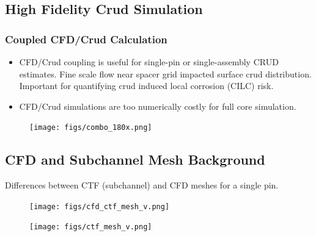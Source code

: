 \documentclass[t, pdftex]{beamer}
\begin{document}
\subsection*{High Fidelity Crud Simulation}
\begin{frame}[shrink=20]
    \frametitle{Coupled CFD/Crud Calculation}
    \begin{itemize}
    \item CFD/Crud coupling is useful for single-pin or single-assembly CRUD estimates.  Fine scale flow near spacer grid impacted surface crud distribution.  Important for quantifying crud induced local corrosion (CILC) risk.
    \item CFD/Crud simulations are too numerically costly for full core simulation.
    \end{itemize}
        \begin{figure}[!htbp]
\centering
\texttt{[image: figs/combo\_180x.png]}
\label{log_closed}
    \end{figure}
\end{frame}

\subsection*{CFD and Subchannel Mesh Background}
\begin{frame}
Differences between CTF (subchannel) and CFD meshes for a single pin.
\begin{figure}
        \centering
        \begin{minipage}{.4\textwidth}
            \centering
            \texttt{[image: figs/cfd\_ctf\_mesh\_v.png]}
        \end{minipage}%
        \begin{minipage}{.4\textwidth}
            \centering
            \texttt{[image: figs/ctf\_mesh\_v.png]}
        \end{minipage}
\end{figure}
\end{frame}

\end{document}
